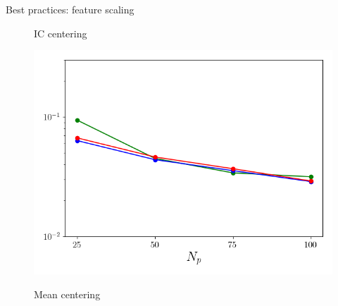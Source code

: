 \documentclass[]{beamer}
\begin{document}
\begin{frame}{Best practices: feature scaling}
\begin{figure}
{\begin{minipage}{0.32\linewidth}
				\caption*{IC centering}
			\end{minipage}
			\begin{minipage}{0.32\linewidth}
				\includegraphics[width=0.99\linewidth]{Images/experiments/cvrc/best_pract/errVsModes_centScale_centMean_Average_errorRaw.png}
				\caption*{Mean centering}
			\end{minipage}
		}
\end{figure}
\end{frame}
\end{document}

